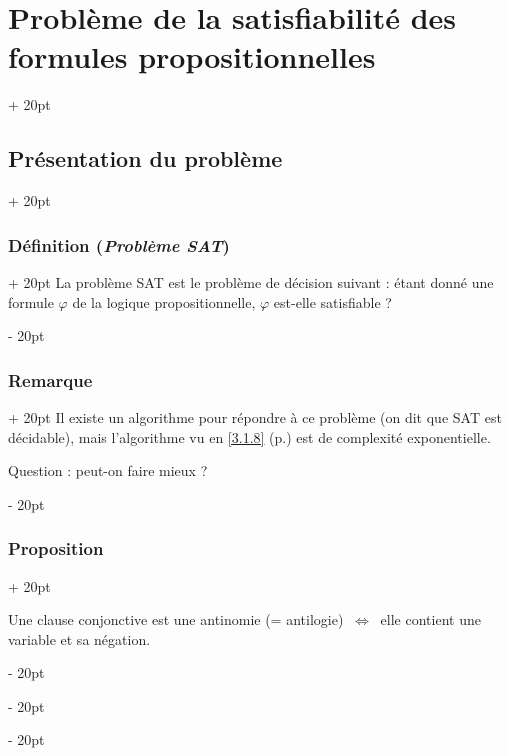 \documentclass[a4paper, 12pt, twoside]{article}
\newcommand{\ssi}{\ \Leftrightarrow \ }
\newcommand{\ind}[1][20pt]{\advance\leftskip + #1}
\newcommand{\deind}[1][20pt]{\advance\leftskip - #1}
\newenvironment{indt}[2][20pt]{#2 \par \ind[#1]}{\par \deind} %
\begin{document}
    \vspace{12pt}
    
    \begin{indt}{\section{Problème de la satisfiabilité des formules propositionnelles}}
        
        \begin{indt}{\subsection{Présentation du problème}}
            \begin{indt}{\subsubsection{Définition (\textit{Problème SAT})}}
                La problème SAT est le problème de décision suivant : étant donné une formule $\varphi$ de la logique propositionnelle, $\varphi$ est-elle satisfiable ?
            \end{indt}
            
            \vspace{12pt}
            
            \begin{indt}{\subsubsection{Remarque}}
                Il existe un algorithme pour répondre à ce problème (on dit que SAT est décidable), mais l'algorithme vu en \ref{3.1.8} (p.\pageref{3.1.8}) est de complexité exponentielle.
                
                Question : peut-on faire mieux ?
            \end{indt}
            
            \vspace{12pt}
            
            \begin{indt}{\subsubsection{Proposition}}
                \label{4.1.3}
                
                \begin{pseudocode}
                    Une clause conjonctive est une antinomie (= antilogie) $\ssi$ elle contient une variable et sa négation.
                \end{pseudocode}
                

\end{indt}
\end{indt}
\end{indt}
\end{document}
